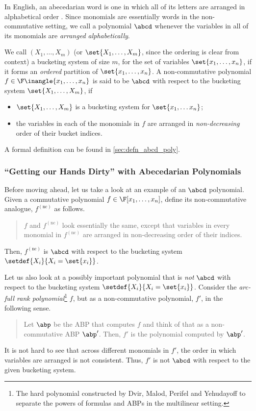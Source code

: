 In English, an abecedarian word is one in which all of its letters are arranged in alphabetical order \cite{MW19}. 
Since monomials are essentially words in the non-commutative setting, we call a polynomial $\abcd$ whenever the variables in all of its monomials are \emph{arranged alphabetically}.
%

We call $(X_1, \ldots, X_m)$ (or $\set{X_1, \ldots, X_m}$, since the ordering is clear from context) a bucketing system of size $m$, for the set of variables $\set{x_1, \ldots, x_n}$, if it forms an \emph{ordered} partition of $\set{x_1, \ldots, x_n}$.
A non-commutative polynomial $f \in \F \inangle{x_1, \ldots, x_n}$ is said to be $\abcd$ with respect to the bucketing system $\set{X_1, \ldots, X_m}$, if 
\begin{itemize}
	\item $\set{X_1, \ldots, X_m}$ is a bucketing system for $\set{x_1, \ldots x_n}$;
	\item the variables in each of the monomials in $f$ are arranged in \emph{non-decreasing} order of their bucket indices. 
\end{itemize}
A formal definition can be found in \autoref{sec:defn_abcd_poly}.

\subsubsection*{``Getting our Hands Dirty'' with Abecedarian Polynomials}

Before moving ahead, let us take a look at an example of an $\abcd$ polynomial.
Given a commutative polynomial $f \in \F[x_1, \ldots, x_n]$, define its non-commutative analogue, $f^{(\text{nc})}$ as follows.
\begin{quote}
	$f$ and $f^{(\text{nc})}$ look essentially the same, except that variables in every monomial in $f^{(\text{nc})}$ are arranged in non-decreasing order of their indices.
\end{quote}
Then, $f^{(\text{nc})}$ is $\abcd$ with respect to the bucketing system $\setdef{X_i}{X_i = \set{x_i}}$. 

Let us also look at a possibly important polynomial that is \emph{not} $\abcd$ with respect to the bucketing system $\setdef{X_i}{X_i = \set{x_i}}$.
Consider the \emph{arc-full rank polynomial}\footnote{The hard polynomial constructed by Dvir, Malod, Perifel and Yehudayoff \cite{DMPY12} to separate the powers of formulas and ABPs in the multilinear setting.} $f$, but as a non-commutative polynomial, $f'$, in the following sense. 
\begin{quote}
	Let $\abp$ be the ABP that computes $f$ and think of that as a non-commutative ABP $\abp'$. Then, $f'$ is the polynomial computed by $\abp'$. 
\end{quote}
It is not hard to see that across different monomials in $f'$, the order in which variables are arranged is not consistent.
Thus, $f'$ is not $\abcd$ with respect to the given bucketing system.


